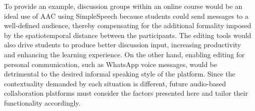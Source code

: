 To provide an example, discussion groups within an online course would be an ideal use of AAC using SimpleSpeech because students could send messages to a well-defined audience, thereby compensating for the additional formality imposed by the spatiotemporal distance between the participants. 
The editing tools would also drive students to produce better discussion input, increasing productivity and enhancing the learning experience.
On the other hand, enabling editing for personal communication, such as WhatsApp voice messages, would be detrimental to the desired informal speaking style of the platform.
Since the contextuality demanded by each situation is different, future audio-based collaboration platforms must consider the factors presented here and tailor their functionality accordingly.